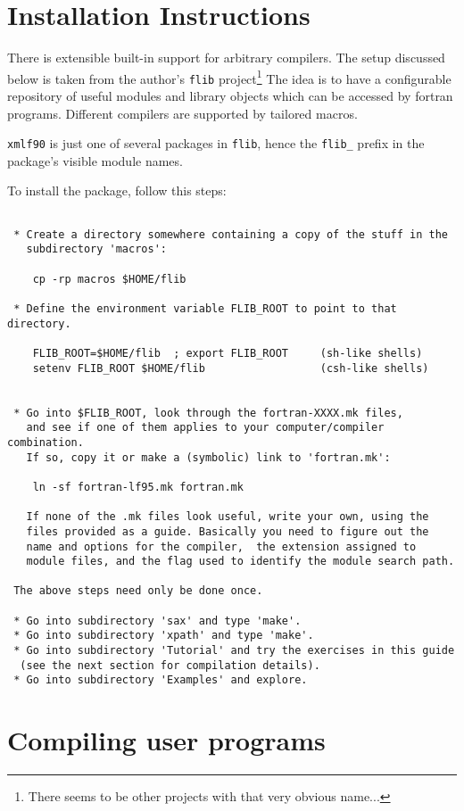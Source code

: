 \documentclass[11pt]{article}
\begin{document}
\newpage
\section{Installation Instructions}
%
There is extensible built-in support for arbitrary compilers.  The
setup discussed below is taken from the author's \texttt{flib}
project\footnote{There seems to be other projects with that very obvious
name...}  The idea is to have a configurable repository of useful
modules and library objects which can be accessed by fortran
programs. Different compilers are supported by tailored macros.

\texttt{xmlf90} is just one of several packages in \texttt{flib},
hence the \texttt{flib\_} prefix in the package's visible module
names.

To install the package, follow this steps:

\begin{verbatim}

 * Create a directory somewhere containing a copy of the stuff in the
   subdirectory 'macros':

	cp -rp macros $HOME/flib

 * Define the environment variable FLIB_ROOT to point to that directory.

	FLIB_ROOT=$HOME/flib  ; export FLIB_ROOT     (sh-like shells)
	setenv FLIB_ROOT $HOME/flib                  (csh-like shells)


 * Go into $FLIB_ROOT, look through the fortran-XXXX.mk files,
   and see if one of them applies to your computer/compiler combination. 
   If so, copy it or make a (symbolic) link to 'fortran.mk':

	ln -sf fortran-lf95.mk fortran.mk

   If none of the .mk files look useful, write your own, using the
   files provided as a guide. Basically you need to figure out the
   name and options for the compiler,  the extension assigned to
   module files, and the flag used to identify the module search path.

 The above steps need only be done once.

 * Go into subdirectory 'sax' and type 'make'.
 * Go into subdirectory 'xpath' and type 'make'.
 * Go into subdirectory 'Tutorial' and try the exercises in this guide
  (see the next section for compilation details).
 * Go into subdirectory 'Examples' and explore.

\end{verbatim}
%
\section{Compiling user programs}
\label{sec:compiling}
\end{document}
